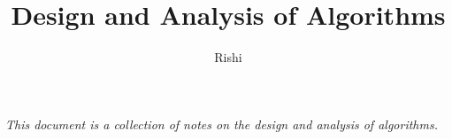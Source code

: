 \documentclass{report}
\title{\huge{Design and Analysis of Algorithms}}
\author{\huge{Rishi}}
\date{}
\begin{document}
\maketitle
\pagestyle{fancy}
\fancyhf{}

\begin{center}
	\emph{This document is a collection of notes on the design and analysis of algorithms.}
\end{center}

\tableofcontents
{}
\pagestyle{headings}


\pagebreak
\end{document}
